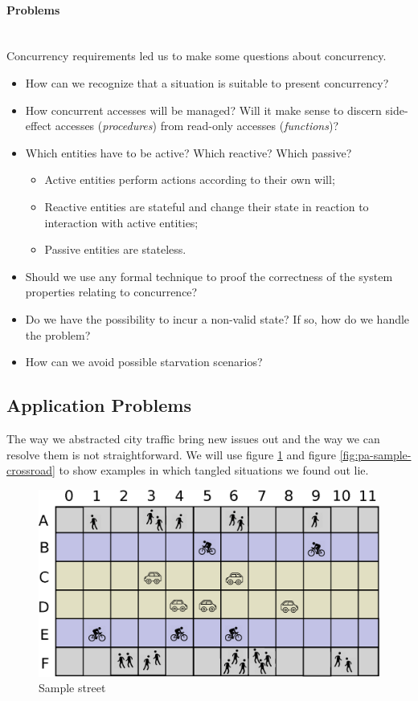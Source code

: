 \paragraph{Problems} \mbox{} \\

Concurrency requirements led us to make some questions about concurrency.

\begin{itemize}
\item How can we recognize that a situation is suitable to present concurrency?
\item How concurrent accesses will be managed? Will it make sense to discern
  side-effect accesses (\emph{procedures}) from read-only accesses
  (\emph{functions})?
\item Which entities have to be active? Which reactive? Which passive?
  \begin{itemize}
    \item Active entities perform actions according to their own will;
    \item Reactive entities are stateful and change their state in reaction to
      interaction with active entities;
    \item Passive entities are stateless.
  \end{itemize}
\item Should we use any formal technique to proof the correctness
of the system properties relating to concurrence?
\item Do we have the possibility to incur a non-valid state? If so, how do we
  handle the problem?
\item How can we avoid possible starvation scenarios?
\end{itemize}


\subsection{Application Problems}\label{sec:pa-app-problems}

The way we abstracted city traffic bring new issues out and the way we can
resolve them is not straightforward.
We will use figure \ref{fig:pa-sample-street} and figure
\ref{fig:pa-sample-crossroad} to show examples in which tangled situations we
found out lie.

\begin{figure}[H]
  \centering
  \includegraphics[width=.7\columnwidth]{images/analysis/street_base.eps}
  \caption{Sample street}
  \label{fig:pa-sample-street}
\end{figure}

